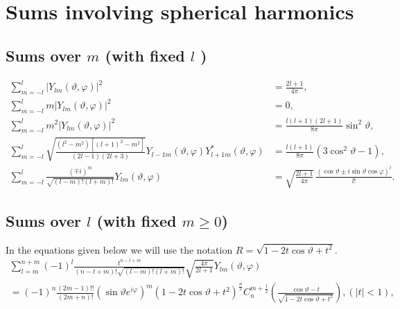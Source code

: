 \section{Sums involving spherical harmonics}\label{sec:5.10}
\subsection{Sums over $m$ (with fixed $l$ )}\label{sec:5.10.1}
\begin{align}
\sum_{m=-l}^{l}\left|Y_{l m}(\vartheta, \varphi)\right|^{2}&=\frac{2 l+1}{4 \pi},  \label{eq:5:10:1}\\
\sum_{m=-l}^{l} m\left|Y_{l m}(\vartheta, \varphi)\right|^{2}&=0,  \label{eq:5:10:2}\\
\sum_{m=-l}^{l} m^{2}\left|Y_{l m}(\vartheta, \varphi)\right|^{2}&=\frac{l(l+1)(2 l+1)}{8 \pi} \sin ^{2} \vartheta,  \label{eq:5:10:3}\\
\sum_{m=-l}^{l} \sqrt{\frac{\left(l^{2}-m^{2}\right)\left[(l+1)^{2}-m^{2}\right]}{(2 l-1)(2 l+3)}} Y_{l-1 m}(\vartheta, \varphi) Y_{l+1 m}^{*}(\vartheta, \varphi)&=\frac{l(l+1)}{8 \pi}\left(3 \cos ^{2} \vartheta-1\right),  \label{eq:5:10:4}\\
\sum_{m=-l}^{l} \frac{(\mp i)^{m}}{\sqrt{(l-m)!(l+m)!}} Y_{l m}(\vartheta, \varphi)&=\sqrt{\frac{2 l+1}{4 \pi}} \, \frac{(\cos \vartheta \pm i \sin \vartheta \cos \varphi)^{l}}{l!} . \label{eq:5:10:5}
\end{align}

\subsection{Sums over $l$ (with fixed $m \geq 0$)}\label{sec:5.10.2}

In the equations given below \cite{ref027} we will use the notation $R=\sqrt{1-2 t \cos \vartheta+t^{2}}$.
\begin{multline}
\sum_{l=m}^{n+m}(-1)^{l} \frac{t^{n-l+m}}{(n-l+m)!\sqrt{(l-m)!(l+m)!}} \sqrt{\frac{4 \pi}{2 l+1}} Y_{l m}(\vartheta, \varphi) \\
=(-1)^{n} \frac{(2 m-1)!!}{(2 m+n)!}\left(\sin \vartheta e^{i \varphi}\right)^{m}\left(1-2 t \cos \vartheta+t^{2}\right)^{\frac{n}{2}} C_{n}^{m+\frac{1}{2}}\left(\frac{\cos \vartheta-t}{\sqrt{1-2 t \cos \vartheta+t^{2}}}\right),(|t|<1),  \label{eq:5:10:6}
\end{multline}

